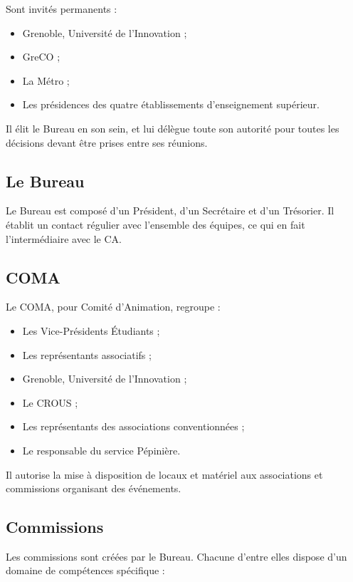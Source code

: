 Sont invités permanents :

\begin{itemize}
\item Grenoble, Université de l'Innovation ;
\item GreCO ;
\item La Métro ;
\item Les présidences des quatre établissements d'enseignement supérieur.
\end{itemize}

Il élit le Bureau en son sein, et lui délègue toute son autorité pour toutes les décisions devant être prises entre ses réunions.

\subsection{Le Bureau}

Le Bureau est composé d'un Président, d'un Secrétaire et d'un Trésorier.
Il établit un contact régulier avec l'ensemble des équipes, ce qui en fait l'intermédiaire avec le CA.

\subsection{COMA}

Le COMA, pour Comité d'Animation, regroupe :

\begin{itemize}
\item Les Vice-Présidents Étudiants ;
\item Les représentants associatifs ;
\item Grenoble, Université de l'Innovation ;
\item Le CROUS ;
\item Les représentants des associations conventionnées ;
\item Le responsable du service Pépinière.
\end{itemize}

Il autorise la mise à disposition de locaux et matériel aux associations
et commissions organisant des événements.

\subsection{Commissions}

Les commissions sont créées par le Bureau.
Chacune d'entre elles dispose d'un domaine de compétences spécifique :

